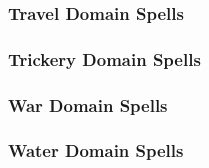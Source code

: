 \begin{spelllist}
    \SLhaste[1]
    \SLenlarge[2]
    \SLmightythrow[3]
    \SLshout[4]
    \SLdivinemight[5]
    \SLseismicslam[6]
    \SLgolemheart[7]
    \SLavatarofmight[8]
    \SLearthquake[9]
\end{spelllist}

\subsubsection{Travel Domain Spells}

\begin{spelllist}
    \SLlongstrider[1]
    \SLdimensionslide[2]
    \SLgaseousform[3]
    \SLairwalk[4]
    \SLshadowstep[5]
    \SLwordofrecall[6]
    \SLavataroftranslocation[7]
    \SLimprisonment[8]
    \SLdimensionalarmy[9]
\end{spelllist}

\subsubsection{Trickery Domain Spells}

\begin{spelllist}
    \SLmaskofthedeceiver[1]
    \SLcreateimage[2]
    \SLinvisibility[3]
    \SLphantasmalkiller[4]
    \SLshadowstep[5]
    \SLshadowwall[6]
    \SLshadowstorm[7]
    \SLmaze[8]
    \SLshadowshield[9]
\end{spelllist}

\subsubsection{War Domain Spells}

\begin{spelllist}
    \SLearthenblade[1]
    \SLflameblade[2]
    \SLaqueousblade[3]
    \SLbladebarrier[4]
    \SLspiritualweapon[5]
    \SLblessedblade[6]
    \SLavatarofshielding[7]
    \SLbladestorm[8]
    \SLavatarofblades[9]
\end{spelllist}

\subsubsection{Water Domain Spells}

\begin{spelllist}
    \SLwaterwalk[1]
    \SLfogcloud[2]
    \SLaqueousblade[3]
    \SLaquaticsphere[4]
    \SLicespike[5]
    \SLpolarray[6]
    \SLicestorm[7]
    \SLdrown[8]
    \SLstormofvengeance[9]
\end{spelllist}

